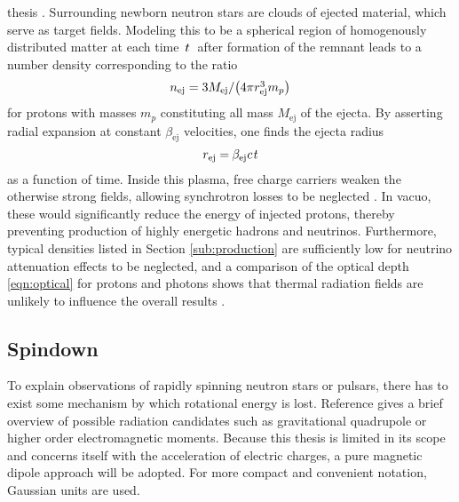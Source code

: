 thesis \cite{Sang_1990}. Surrounding newborn neutron stars are clouds of ejected material, which serve as target fields. Modeling this
to be a spherical region of homogenously distributed matter at each time~$t \kern+0.5pt$~after formation of the remnant leads to
a number density corresponding to the ratio
\begin{equation}
	\cramped{n_\text{ej} = 3 M_\text{ej} / \bigl( 4\pi r_\text{ej}^3 m_p \bigr)} \kern+0.5pt
	\label{eqn:number-density}
\end{equation}
for protons with masses $m_p$ constituting all mass $M_\text{ej}$ of the ejecta. By asserting radial expansion at constant
$\beta_\text{ej}$ velocities, one finds the ejecta radius
\begin{equation}
	r_\text{ej} = \kern-0.4pt \beta_\text{ej} \kern+0.1pt c \kern+1.0pt t
	\label{eqn:ejecta-radius}
\end{equation}
as a function of time. Inside this plasma, free charge carriers weaken the otherwise strong fields, allowing synchrotron losses to be
neglected \cite{Carpio_2020}. In vacuo, these would significantly reduce the energy of injected protons, thereby preventing production
of highly energetic hadrons and neutrinos. Furthermore, typical densities listed in Section \ref{sub:production} are sufficiently low for
neutrino attenuation effects to be neglected, and a comparison of the optical depth \eqref{eqn:optical} for protons and photons shows that
thermal radiation fields are unlikely to influence the overall results \cite{Carpio_2020}.


\enlargethispage*{2\baselineskip}\newpage


\subsection{Spindown}
\label{sub:spindown}

To explain observations of rapidly spinning neutron stars or pulsars, there has to exist some mechanism by which rotational energy is
lost. Reference \cite{Alvarez_2004} gives a brief overview of possible radiation candidates such as gravitational quadrupole or
higher order electromagnetic moments. Because this thesis is limited in its scope and concerns itself with the acceleration of
electric charges, a pure magnetic dipole approach will be adopted. For more compact and convenient notation, Gaussian units are used.

